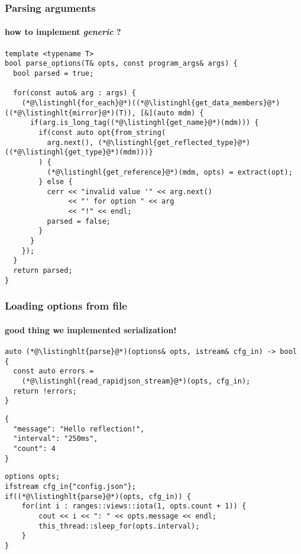 \documentclass[compress,table,xcolor=table]{beamer}
\begin{document}
\begin{frame}[fragile]
  \frametitle{Parsing arguments}
  \framesubtitle{how to implement {\em \larger generic} ?}
  \begin{lstlisting}[language=c++2x,basicstyle=\scriptsize\ttfamily]
template <typename T>
bool parse_options(T& opts, const program_args& args) {
  bool parsed = true;

  for(const auto& arg : args) {
    (*@\listinghl{for_each}@*)((*@\listinghl{get_data_members}@*)((*@\listinghlt{mirror}@*)(T)), [&](auto mdm) {
      if(arg.is_long_tag((*@\listinghl{get_name}@*)(mdm))) {
        if(const auto opt{from_string(
          arg.next(), (*@\listinghl{get_reflected_type}@*)((*@\listinghl{get_type}@*)(mdm)))}
        ) {
          (*@\listinghl{get_reference}@*)(mdm, opts) = extract(opt);
        } else {
          cerr << "invalid value '" << arg.next()
               << "' for option " << arg
               << "!" << endl;
          parsed = false;
        }
      }
    });
  }
  return parsed;
}
  \end{lstlisting}
\end{frame}
\begin{frame}[fragile]
  \frametitle{Loading options from file}
  \framesubtitle{good thing we implemented serialization!}
  \begin{lstlisting}[language=c++2x,basicstyle=\scriptsize\ttfamily]
auto (*@\listinghlt{parse}@*)(options& opts, istream& cfg_in) -> bool {
  const auto errors =
    (*@\listinghl{read_rapidjson_stream}@*)(opts, cfg_in);
  return !errors;
}
  \end{lstlisting}
  \begin{verbatim}
{
  "message": "Hello reflection!",
  "interval": "250ms",
  "count": 4
}
  \end{verbatim}
  \vfill
  \begin{lstlisting}[language=c++2x,basicstyle=\scriptsize\ttfamily]
options opts;
ifstream cfg_in{"config.json"};
if((*@\listinghlt{parse}@*)(opts, cfg_in)) {
    for(int i : ranges::views::iota(1, opts.count + 1)) {
        cout << i << ": " << opts.message << endl;
        this_thread::sleep_for(opts.interval);
    }
}
  \end{lstlisting}
\end{frame}
\end{document}
